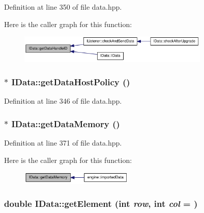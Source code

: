 Definition at line 350 of file data.hpp.

Here is the caller graph for this function:\nopagebreak
\begin{figure}[H]
\begin{center}
\leavevmode
\includegraphics[width=259pt]{class_i_data_af0448989fa9d551acfb8ead2523a32e5_icgraph}
\end{center}
\end{figure}
\hypertarget{class_i_data_a9b586d8ceb8ebb508165851dae75cad2}{
\subsubsection[{getDataHostPolicy}]{$\ast$ IData::getDataHostPolicy ()}}
\label{class_i_data_a9b586d8ceb8ebb508165851dae75cad2}


Definition at line 346 of file data.hpp.\hypertarget{class_i_data_a1fa868533294d82de9491e5ee179dc2e}{
\subsubsection[{getDataMemory}]{$\ast$ IData::getDataMemory ()}}
\label{class_i_data_a1fa868533294d82de9491e5ee179dc2e}


Definition at line 371 of file data.hpp.

Here is the caller graph for this function:\nopagebreak
\begin{figure}[H]
\begin{center}
\leavevmode
\includegraphics[width=153pt]{class_i_data_a1fa868533294d82de9491e5ee179dc2e_icgraph}
\end{center}
\end{figure}
\hypertarget{class_i_data_ae766e303b50d3af4cbfd8c3dad4672c1}{
\subsubsection[{getElement}]{\setlength{\rightskip}{0pt plus 5cm}double IData::getElement (int {\em row}, \/  int {\em col} = {})}}
\label{class_i_data_ae766e303b50d3af4cbfd8c3dad4672c1}


